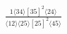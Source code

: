 \documentclass[varwidth, border=5pt]{standalone}
\begin{document}
\begin{my}
$\begin{gathered}
\scriptscriptstyle\frac{1⟨34⟩[35]^2⟨24⟩}{⟨12⟩⟨25⟩[25]^2⟨45⟩}
\end{gathered}$
\end{my}
\end{document}
